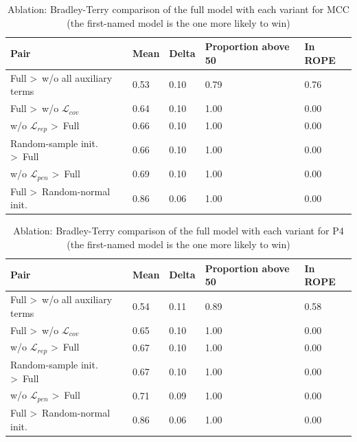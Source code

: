 \begin{table}[H]
\caption{Ablation: Bradley-Terry comparison of the full model with each variant for MCC (the first-named model is the one more likely to win)}
\label{tab:BTablation_MCC}
\centering
\scriptsize
\begin{tabular}{@{}lllll@{}}
\toprule
Pair & Mean & Delta & Proportion above 50 & In ROPE \\
\midrule
Full \textgreater\ w/o all auxiliary terms & 0.53 & 0.10 & 0.79 & 0.76 \\
Full \textgreater\ w/o $\mathcal{L}_{cov}$ & 0.64 & 0.10 & 1.00 & 0.00 \\
w/o $\mathcal{L}_{rep}$ \textgreater\ Full & 0.66 & 0.10 & 1.00 & 0.00 \\
Random-sample init. \textgreater\ Full & 0.66 & 0.10 & 1.00 & 0.00 \\
w/o $\mathcal{L}_{pen}$ \textgreater\ Full & 0.69 & 0.10 & 1.00 & 0.00 \\
Full \textgreater\ Random-normal init. & 0.86 & 0.06 & 1.00 & 0.00 \\
\bottomrule
\end{tabular}%
\end{table}

\begin{table}[H]
\caption{Ablation: Bradley-Terry comparison of the full model with each variant for P4 (the first-named model is the one more likely to win)}
\label{tab:BTablation_P4}
\centering
\scriptsize
\begin{tabular}{@{}lllll@{}}
\toprule
Pair & Mean & Delta & Proportion above 50 & In ROPE \\
\midrule
Full \textgreater\ w/o all auxiliary terms & 0.54 & 0.11 & 0.89 & 0.58 \\
Full \textgreater\ w/o $\mathcal{L}_{cov}$ & 0.65 & 0.10 & 1.00 & 0.00 \\
w/o $\mathcal{L}_{rep}$ \textgreater\ Full & 0.67 & 0.10 & 1.00 & 0.00 \\
Random-sample init. \textgreater\ Full & 0.67 & 0.10 & 1.00 & 0.00 \\
w/o $\mathcal{L}_{pen}$ \textgreater\ Full & 0.71 & 0.09 & 1.00 & 0.00 \\
Full \textgreater\ Random-normal init. & 0.86 & 0.06 & 1.00 & 0.00 \\
\bottomrule
\end{tabular}%
\end{table}


